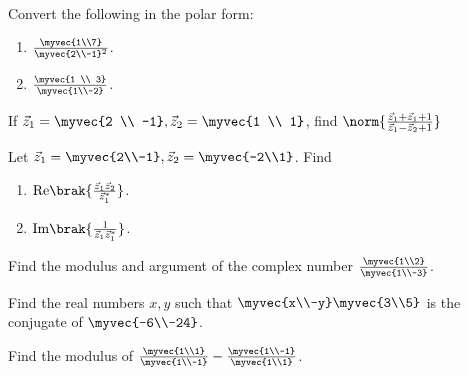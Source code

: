 \\
\solution 

%
\item Convert the following in the polar form:
\begin{enumerate}
\item $\frac{\myvec{1\\7}}{\myvec{2\\-1}^2}$.
\item $\frac{\myvec{1 \\ 3}}{\myvec{1\\-2}}$.
\end{enumerate}
\solution 

%
\item If $\vec{z}_1 = \myvec{2 \\ -1}, \vec{z}_2 = \myvec{1 \\ 1}$, find $\norm{\frac{\vec{z}_1+\vec{z}_1+1}{\vec{z}_1-\vec{z}_2 + 1}}$
\\
\solution 

\item Let $\vec{z}_1 = \myvec{2\\-1}, \vec{z}_2 = \myvec{-2\\1}$.  Find 
\begin{enumerate}
\item $\text{Re}\brak{\frac{\vec{z}_1\vec{z}_2}{\vec{z}^{*}_1}}$.
\item $\text{Im}\brak{\frac{1}{\vec{z}_1\vec{z}^{*}_1}}$.
\end{enumerate}
\solution 

%
\item Find the modulus and argument of the complex number $\frac{\myvec{1\\2}}{\myvec{1\\-3}}$.
\\
\solution 

\item Find the real numbers $x, y$ such that $\myvec{x\\-y}\myvec{3\\5}$ is the conjugate of $\myvec{-6\\-24}$.
\\
\solution 

%
\item Find the modulus of $\frac{\myvec{1\\1}}{\myvec{1\\-1}}-\frac{\myvec{1\\-1}}{\myvec{1\\1}}$.
\\
\solution 

%
